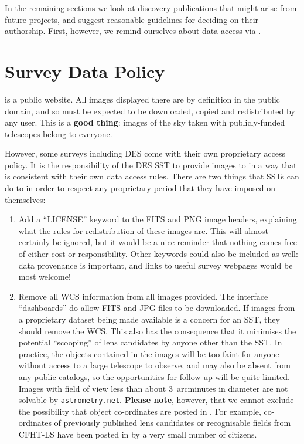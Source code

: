 \documentclass[a4paper,twocolumn]{article}
\begin{document}
In the remaining sections we look at discovery publications that might
arise from future \SW projects, and suggest reasonable guidelines for
deciding on their authorship. First, however, we remind ourselves about data
access via \SW.



\section{Survey Data Policy}
\label{sec:data}

\SW is a public website. All images displayed there are by definition in the
public domain, and so must be expected to be downloaded, copied and
redistributed by any \SW user. This is a \textbf{good thing}: images of the sky taken
with publicly-funded telescopes belong to everyone. 

However, some surveys including DES come with their own proprietary access policy. It is the responsibility
of the DES SST to provide images to \SW in a way that is consistent
with their own data access rules. There are two things that SSTs can
do to in order to respect any proprietary period that they have imposed on
themselves:
\begin{enumerate}

\item Add a ``LICENSE'' keyword to the FITS and PNG image headers, explaining
what the rules for redistribution of these images are. This will almost
certainly be ignored, but it would be a nice reminder that nothing comes free
of either cost or responsibility. Other keywords could also be included as
well: data provenance is important, and links to useful survey webpages would
be most welcome!

\item Remove all WCS information from all images provided. The \SW interface ``dashboards'' do allow FITS and JPG files to be downloaded. If images from a proprietary dataset being made available is a concern for an SST, they should remove the WCS. This also has the consequence that it minimises the potential ``scooping'' of  lens candidates by anyone other than the SST. 
In practice, the objects contained in the \SW images will be too faint
for anyone without access to a large telescope to observe, and may also be
absent from any public catalogs, so the opportunities for follow-up will be
quite limited. Images
with field of view less than about 3~arcminutes in diameter are not solvable
by \texttt{astrometry.net}. \textbf{Please note}, however, that we cannot exclude the possibility that object co-ordinates are posted in \Talk. For example, co-ordinates of previously published lens candidates or recognisable fields from CFHT-LS have been posted in \Talk by a very small number of citizens.

\end{enumerate}
\end{document}
